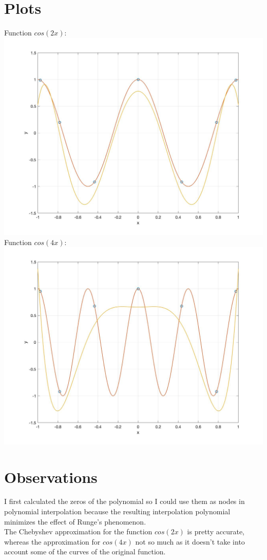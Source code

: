 \documentclass{article}
\begin{document}
\section{Plots}
Function $cos(2x)$:\\
\includegraphics[width=\textwidth,height=\textheight,keepaspectratio]{cos2x.jpg}\\
Function $cos(4x)$:\\
\includegraphics[width=\textwidth,height=\textheight,keepaspectratio]{cos4x.jpg}
\section{Observations}
I first calculated the zeros of the polynomial so I could use them as nodes in polynomial interpolation because the resulting interpolation polynomial minimizes the effect of Runge's phenomenon.\\

The Chebyshev approximation for the function $cos(2x)$ is pretty accurate, whereas the approximation for $cos(4x)$ not so much as it doesn't take into account some of the curves of the original function.
\end{document}
